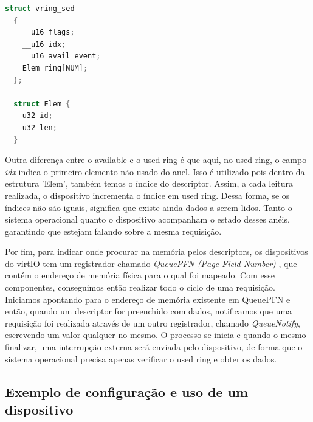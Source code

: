 \begin{lstlisting}[language=C]
  struct vring_sed
  {
    __u16 flags;
    __u16 idx;
    __u16 avail_event;
    Elem ring[NUM];
  };

  struct Elem {
    u32 id;
    u32 len;
  }
\end{lstlisting}


Outra diferença entre o available e o used ring é que aqui, no used ring, o campo \emph{idx} indica o primeiro elemento não usado do anel.
Isso é utilizado pois dentro da estrutura 'Elem', também temos o índice do descriptor. Assim, a cada leitura realizada, o dispositivo incrementa o índice em used ring.
Dessa forma, se os índices não são iguais, significa que existe ainda dados a serem lidos. 	Tanto o sistema operacional quanto o dispositivo acompanham o estado desses anéis, garantindo que estejam falando sobre a mesma requisição.


Por fim, para indicar onde procurar na memória pelos descriptors, os dispositivos do virtIO tem um registrador chamado \emph{QueuePFN (Page Field Number)} , que contém o endereço de memória física para o qual foi mapeado. Com esse componentes, conseguimos então realizar todo o ciclo de uma requisição. Iniciamos apontando para o endereço de memória existente em QueuePFN e então, quando um descriptor for preenchido com dados, notificamos que uma requisição foi realizada através de um outro registrador, chamado \emph{QueueNotify}, escrevendo um valor qualquer no mesmo. O processo se inicia e quando o mesmo finalizar, uma interrupção externa será enviada pelo dispositivo, de forma que o sistema operacional precisa apenas verificar o used ring e obter os dados.


\subsection*{Exemplo de configuração e uso de um dispositivo}

